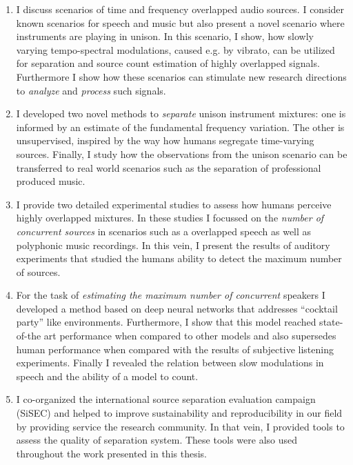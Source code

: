 \begin{enumerate}
\item I discuss scenarios of time and frequency overlapped audio sources.
I consider known scenarios for speech and music but also present a novel scenario where instruments are playing in unison.
In this scenario, I show, how slowly varying tempo-spectral modulations, caused e.g. by vibrato, can be utilized for separation and source count estimation of highly overlapped signals.
Furthermore I show how these scenarios can stimulate new research directions to \emph{analyze} and \emph{process} such signals.\\

\item I developed two novel methods to \emph{separate} unison instrument mixtures: one is informed by an estimate of the fundamental frequency variation.
The other is unsupervised, inspired by the way how humans segregate time-varying sources.
Finally, I study how the observations from the unison scenario can be transferred to real world scenarios such as the separation of professional produced music.\\

\item I provide two detailed experimental studies to assess how humans perceive highly overlapped mixtures.
In these studies I focussed on the \emph{number of concurrent sources} in scenarios such as a overlapped speech as well as polyphonic music recordings.
In this vein, I present the results of auditory experiments that studied the humans ability to detect the maximum number of sources.\\

\item For the task of \emph{estimating the maximum number of concurrent} speakers I developed a method based on deep neural networks that addresses ``cocktail party'' like environments.
Furthermore, I show that this model reached state-of-the art performance when compared to other models and also supersedes human performance when compared with the results of subjective listening experiments.
Finally I revealed the relation between slow modulations in speech and the ability of a model to count.\\

\item I co-organized the international source separation evaluation campaign (SiSEC) and helped to improve sustainability and reproducibility in our field by providing service the research community. In that vein, I provided tools to assess the quality of separation system. These tools were also used throughout the work presented in this thesis.
\end{enumerate}

